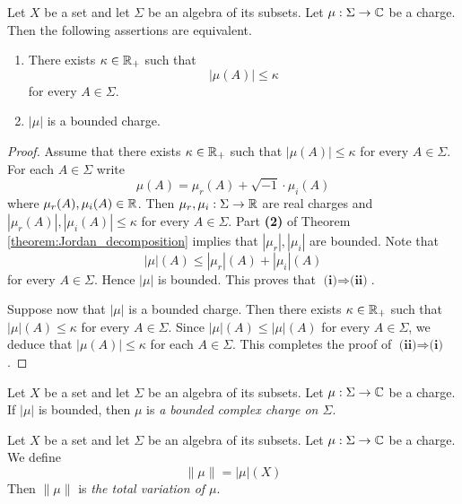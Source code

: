 \begin{theorem}\label{theorem:charge_is_bounded_if_variation_is_finite}
    Let $X$ be a set and let $\Sigma$ be an algebra of its subsets. Let $\mu:\Sigma \rightarrow {\mathbb C}$ be a charge. Then the following assertions are equivalent.
    \begin{enumerate}[label=\emph{\textbf{(\roman*)}}, leftmargin=*]
        \item There exists $\kappa \in {\mathbb R}_+$ such that
              $$|\mu(A)|\leq \kappa$$
              for every $A \in \Sigma$.
        \item $|\mu|$ is a bounded charge.
    \end{enumerate}
\end{theorem}
\begin{proof}
    Assume that there exists $\kappa \in {\mathbb R}_+$ such that $|\mu(A)| \leq \kappa$ for every $A \in \Sigma$. For each $A \in \Sigma$ write
    $$\mu(A) = \mu_r(A) + \sqrt{-1}\cdot \mu_i(A)$$
    where $\mu_r(A),\mu_i(A) \in {\mathbb R}$. Then $\mu_r,\mu_i:\Sigma \rightarrow {\mathbb R}$ are real charges and $|\mu_r(A)|,|\mu_i(A)| \leq \kappa$ for every $A \in \Sigma$. Part \textbf{(2)} of Theorem \ref{theorem:Jordan_decomposition} implies that $|\mu_r|,|\mu_i|$ are bounded. Note that
    $$|\mu|(A) \leq |\mu_r|(A) + |\mu_i|(A)$$
    for every $A \in \Sigma$. Hence $|\mu|$ is bounded. This proves that $\textbf{(i)}\Rightarrow \textbf{(ii)}$.

    Suppose now that $|\mu|$ is a bounded charge. Then there exists $\kappa \in {\mathbb R}_+$ such that $|\mu|(A) \leq \kappa$ for every $A \in \Sigma$. Since $|\mu|(A)\leq |\mu|(A)$ for every $A \in \Sigma$, we deduce that $|\mu(A)|\leq \kappa$ for each $A \in \Sigma$. This completes the proof of $\textbf{(ii)}\Rightarrow \textbf{(i)}$.
\end{proof}

\begin{definition}
    Let $X$ be a set and let $\Sigma$ be an algebra of its subsets. Let $\mu:\Sigma \rightarrow {\mathbb C}$ be a charge. If $|\mu|$ is bounded, then $\mu$ is \textit{a bounded complex charge on $\Sigma$}.
\end{definition}

\begin{definition}
    Let $X$ be a set and let $\Sigma$ be an algebra of its subsets. Let $\mu:\Sigma \rightarrow {\mathbb C}$ be a charge. We define
    $$\lVert \mu \rVert = |\mu|(X)$$
    Then $\lVert \mu \rVert$ is \textit{the total variation of $\mu$}.
\end{definition}

